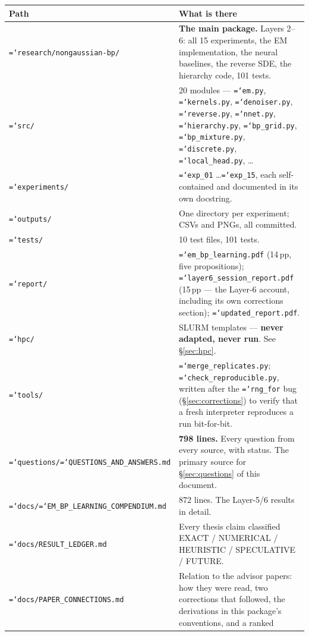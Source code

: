 \documentclass[11pt,a4paper]{article}
\newcommand{\code}[1]{\texttt{\small\hyphenchar\font=`\-\relax #1}}
\begin{document}
\begin{center}
\begin{tabular}{@{}p{6.4cm}p{8.8cm}@{}}
\toprule
\textbf{Path} & \textbf{What is there} \\
\midrule
\code{research/nongaussian-bp/} & \textbf{The main package.} Layers 2--6: all 15
experiments, the EM implementation, the neural baselines, the reverse SDE, the hierarchy
code, 101 tests. \\
\code{\quad src/} & 20 modules --- \code{em.py}, \code{kernels.py}, \code{denoiser.py},
\code{reverse.py}, \code{nnet.py}, \code{hierarchy.py}, \code{bp\_grid.py},
\code{bp\_mixture.py}, \code{discrete.py}, \code{local\_head.py}, \dots \\
\code{\quad experiments/} & \code{exp\_01} \dots \code{exp\_15}, each self-contained and
documented in its own docstring. \\
\code{\quad outputs/} & One directory per experiment; CSVs and PNGs, all committed. \\
\code{\quad tests/} & 10 test files, 101 tests. \\
\code{\quad report/} & \code{em\_bp\_learning.pdf} (14\,pp, five propositions);
\code{layer6\_session\_report.pdf} (15\,pp --- the Layer-6 account, including its own
corrections section); \code{updated\_report.pdf}. \\
\code{\quad hpc/} & SLURM templates --- \textbf{never adapted, never run}. See \S\ref{sec:hpc}. \\
\code{\quad tools/} & \code{merge\_replicates.py}; \code{check\_reproducible.py}, written
after the \code{rng\_for} bug (\S\ref{sec:corrections}) to verify that a fresh interpreter
reproduces a run bit-for-bit. \\
\midrule
\code{questions/}\newline\code{\quad QUESTIONS\_AND\_ANSWERS.md} & \textbf{798 lines.} Every
question from every source, with status. The primary source for \S\ref{sec:questions} of
this document. \\
\code{docs/}\newline\code{\quad EM\_BP\_LEARNING\_COMPENDIUM.md} & 872 lines. The Layer-5/6
results in detail. \\
\code{docs/RESULT\_LEDGER.md} & Every thesis claim classified
EXACT / NUMERICAL / HEURISTIC / SPECULATIVE / FUTURE. \\
\code{docs/PAPER\_CONNECTIONS.md} & Relation to the advisor papers: how they were read, two
corrections that followed, the derivations in this package's conventions, and a ranked

\end{tabular}
\end{center}
\end{document}
